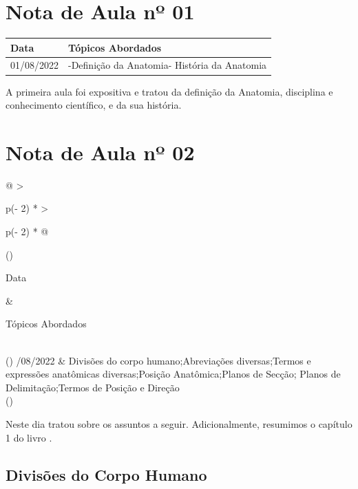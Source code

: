 \documentclass[
]{book}
\begin{document}
\hypertarget{nota-de-aula-nuxba-01}{%
\section{Nota de Aula nº 01}\label{nota-de-aula-nuxba-01}}

\begin{longtable}[]{@{}ll@{}}
\toprule()
Data & Tópicos Abordados \\
\midrule()
\endhead
01/08/2022 & -Definição da Anatomia- História da Anatomia \\
\bottomrule()
\end{longtable}

A primeira aula foi expositiva e tratou da definição da Anatomia, disciplina e conhecimento científico, e da sua história.

\hypertarget{nota-de-aula-nuxba-02}{%
\section{Nota de Aula nº 02}\label{nota-de-aula-nuxba-02}}

\begin{longtable}[]{@{}
  >{\raggedright\arraybackslash}p{(\columnwidth - 2\tabcolsep) * }
  >{\raggedright\arraybackslash}p{(\columnwidth - 2\tabcolsep) * }@{}}
\toprule()
\begin{minipage}[b]{\linewidth}\raggedright
Data
\end{minipage} & \begin{minipage}[b]{\linewidth}\raggedright
Tópicos Abordados
\end{minipage} \\
\midrule()
/08/2022 & Divisões do corpo humano;Abreviações diversas;Termos e expressões anatômicas diversas;Posição Anatômica;Planos de Secção; Planos de Delimitação;Termos de Posição e Direção \\
\bottomrule()
\end{longtable}

Neste dia \citet{PROF-SOUSA-2022} tratou sobre os assuntos a seguir. Adicionalmente, resumimos o capítulo 1 do livro \citet{MARIEB-WILHELM-MALLAT-2014}.

\hypertarget{divisuxf5es-do-corpo-humano}{%
\subsection{Divisões do Corpo Humano}\label{divisuxf5es-do-corpo-humano}}
\end{document}
